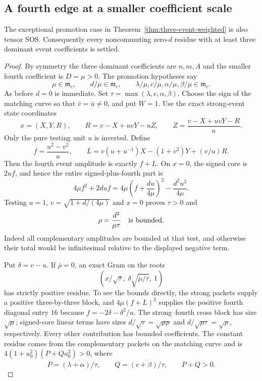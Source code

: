 \subsection{A fourth edge at a smaller coefficient scale}
\begin{proposition}\label{prop:fourth-edge-promotion}
The exceptional promotion case in Theorem~\ref{thm:three-event-weighted} is also tensor SOS. Consequently every noncommuting zero-$d$ residue with at least three dominant event coefficients is settled.
\end{proposition}
\begin{proof}
By symmetry the three dominant coefficients are $n,m,A$ and the smaller fourth coefficient is $D=\mu>0$. The promotion hypotheses say
\[
\mu\in\mathfrak m_c,\qquad d/\mu\in\mathfrak m_c,
\qquad \lambda/\mu,c/\mu,\alpha/\mu,\beta/\mu\in\mathfrak m_c.
\]
As before $d=0$ is immediate. Set $\tau=\max(\lambda,c,\alpha,\beta)$. Choose the sign of the matching curve so that $\bar v=\bar u\ne0$, and put $W=1$. Use the exact strong-event state coordinates
\[
x=(X,Y,R),\qquad R=v-X+uvY-uZ,
\qquad Z=\frac{v-X+uvY-R}{u}.
\]
Only the pure testing unit $u$ is inverted. Define
\[
f=\frac{u^2-v^2}{u},\qquad
L=v(u+u^{-1})X-(1+v^2)Y+(v/u)R.
\]
Then the fourth event amplitude is exactly $f+L$. On $x=0$, the signed core is $2uf$, and hence the entire signed-plus-fourth part is
\[
4\mu f^2+2duf=4\mu\left(f+\frac{du}{4\mu}\right)^2
 -\frac{d^2u^2}{4\mu}.
\]
Testing $u=1$, $v=\sqrt{1+d/(4\mu)}$ and $x=0$ proves $\tau>0$ and
\[
\rho=\frac{d^2}{\mu\tau}\quad\hbox{is bounded}.
\]
Indeed all complementary amplitudes are bounded at that test, and otherwise their total would be infinitesimal relative to the displayed negative term.

Put $\delta=v-u$. If $\bar\rho=0$, an exact Gram on the roots
\[
\left(x/\sqrt\tau,\ \delta\sqrt{\mu/\tau},\ 1\right)
\]
has strictly positive residue. To see the bounds directly, the strong packets supply a positive three-by-three block, and $4\mu(f+L)^2$ supplies the positive fourth diagonal entry $16$ because $f=-2\delta-\delta^2/u$. The strong--fourth cross block has size $\sqrt\mu$; signed-core linear terms have sizes $d/\sqrt\tau=\sqrt{\mu\rho}$ and $d/\sqrt{\mu\tau}=\sqrt\rho$, respectively. Every other contribution has bounded coefficients. The constant residue comes from the complementary packets on the matching curve and is
$4(1+u_0^2)(P+Qu_0^2)>0$, where
\[
P=\overline{(\lambda+\alpha)/\tau},\qquad
Q=\overline{(c+\beta)/\tau},\qquad P+Q>0.
\]


\end{proof}
